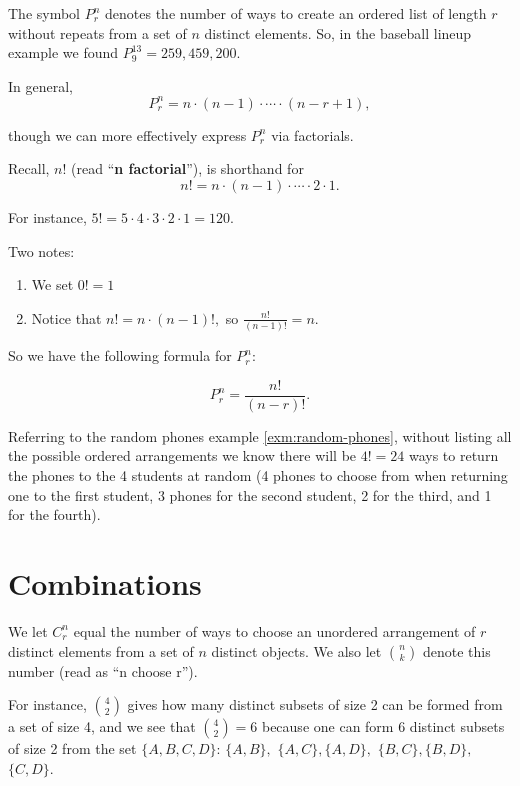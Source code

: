 \documentclass[
]{book}
\providecommand{\tightlist}{%
  \setlength{\itemsep}{0pt}\setlength{\parskip}{0pt}}
\theoremstyle{definition}
\theoremstyle{definition}
\theoremstyle{definition}
\theoremstyle{definition}
\theoremstyle{remark}
\begin{document}
The symbol \(\displaystyle P^n_r\) denotes the number of ways to create an ordered list of length \(r\) without repeats from a set of \(n\) distinct elements. So, in the baseball lineup example we found \(\displaystyle P^{13}_9 = 259,459,200.\)

In general, \[P^n_r = n \cdot (n-1) \cdot \cdots \cdot (n-r+1),\]

though we can more effectively express \(\displaystyle P^n_r\) via factorials.

Recall, \(n!\) (read ``\textbf{n factorial}''), is shorthand for \[n! = n \cdot (n-1) \cdot \cdots \cdot 2 \cdot 1.\]

For instance, \(5! = 5 \cdot 4 \cdot 3 \cdot 2 \cdot 1 = 120\).

Two notes:

\begin{enumerate}
\def\labelenumi{\arabic{enumi}.}
\tightlist
\item
  We set \(0! = 1\)
\item
  Notice that \(n! = n \cdot (n-1)!,\) so \(\displaystyle \frac{n!}{(n-1)!} = n\).
\end{enumerate}

So we have the following formula for \(\displaystyle P^n_r\):

\begin{equation} 
  P^n_r = \frac{n!}{(n-r)!}.
  \label{eq:Pnr}
\end{equation}

Referring to the random phones example \ref{exm:random-phones}, without listing all the possible ordered arrangements we know there will be \(4!= 24\) ways to return the phones to the 4 students at random (4 phones to choose from when returning one to the first student, 3 phones for the second student, 2 for the third, and 1 for the fourth).

\section{Combinations}\label{combinations}

We let \(\displaystyle C^n_r\) equal the number of ways to choose an unordered arrangement of \(r\) distinct elements from a set of \(n\) distinct objects. We also let \(\displaystyle\binom{n}{k}\) denote this number (read as ``n choose r'').

For instance, \(\displaystyle\binom{4}{2}\) gives how many distinct subsets of size 2 can be formed from a set of size 4, and we see that \(\displaystyle\binom{4}{2} = 6\) because one can form 6 distinct subsets of size 2 from the set \(\{A,B,C,D\}\): \(\{A,B\},\) \(\{A,C\},\)\(\{A,D\},\) \(\{B,C\},\)\(\{B,D\},\) \(\{C,D\}\).
\end{document}
